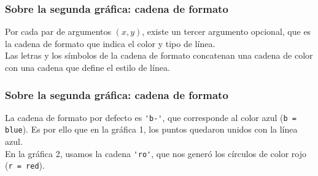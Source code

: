 \begin{frame}[fragile]
\frametitle{Sobre la segunda gráfica: cadena de formato}
Por cada par de argumentos $(x, y )$, existe un tercer argumento opcional, que es la cadena de formato que indica el color y tipo de línea.
\\
\bigskip
Las letras y los símbolos de la cadena de formato concatenan una cadena de color con una cadena que define el estilo de línea.

\end{frame}
\begin{frame}[fragile]
\frametitle{Sobre la segunda gráfica: cadena de formato}
La cadena de formato por defecto es \verb|'b-'|, que corresponde al color azul (\verb|b = blue|). Es por ello que en la gráfica 1, los puntos quedaron unidos con la línea azul.
\\
\bigskip
En la gráfica 2, usamos la cadena \verb|'ro'|, que nos generó los círculos de color rojo (\verb|r = red|).
\end{frame}
